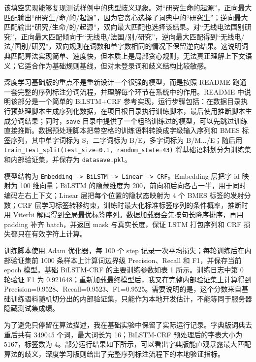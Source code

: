 \documentclass[12pt,a4paper,UTF8]{ctexart}
\newcommand{\xiaosi}{\fontsize{12pt}{18pt}\selectfont}
\newenvironment{reportbody}{\songti\xiaosi\onehalfspacing\sloppy}{}
\begin{document}
\begin{reportbody}
该填空实现能够复现测试样例中的典型歧义现象。对“研究生命的起源”，正向最大匹配输出“研究生/命/的/起源”，因为它贪心选择了词典中的“研究生”；逆向最大匹配输出“研究/生命/的/起源”，双向最大匹配也选择该结果。对“无线电法国别研究”，正向最大匹配倾向于“无线电/法国/别/研究”，逆向最大匹配得到“无线电/法/国别/研究”，双向规则在词数和单字数相同的情况下保留逆向结果。这说明词典匹配算法实现简单、速度快，但本质上是局部贪心规则，无法真正理解上下文语义；它适合作为基础规则基线，但对未登录词和歧义结构比较敏感。

深度学习基础版的重点不是重新设计一个很强的模型，而是按照 README 跑通一套完整的序列标注分词流程，并理解每个环节在系统中的作用。README 中说明该部分是一个简单的 BiLSTM+CRF 参考实现，运行步骤包括：在数据目录执行预处理脚本生成序列化数据，在项目根目录执行训练脚本，最后使用推断脚本生成分词结果；同时，\texttt{save} 目录中提供了一个粗略训练过的模型，可以先跳过训练直接推断。数据预处理脚本把带空格的训练语料转换成字级输入序列和 BMES 标签序列，其中单字词标为 S，二字词标为 B/E，多字词标为 B/M.../E；随后用 \texttt{train\_test\_split(test\_size=0.1, random\_state=43)} 将基础语料划分为训练集和内部验证集，并保存为 \texttt{datasave.pkl}。

模型结构为 \texttt{Embedding -> BiLSTM -> Linear -> CRF}。Embedding 层把字 id 映射为 100 维向量；BiLSTM 的隐藏维度为 200，前向和后向各占一半，用于同时编码左右上下文；Linear 层把每个位置的隐状态映射为 4 个 BMES 标签的发射分数；CRF 层学习标签转移约束，训练时最大化标准标签序列的条件概率，推断时用 Viterbi 解码得到全局最优标签序列。数据加载器会先按句长降序排序，再用 padding 补齐 batch，并返回 mask 与真实长度，保证 LSTM 打包序列和 CRF 损失都只在有效字符上计算。

训练脚本使用 Adam 优化器，每 100 个 step 记录一次平均损失；每轮训练后在内部验证集前 1000 条样本上计算词边界级 Precision、Recall 和 F1，并保存当前 epoch 模型。基础 BiLSTM-CRF 的主要训练参数如表 1 所示。训练日志中第 0 轮验证 F1 为 0.921648；重新加载最终模型后，我又在完整内部验证集上计算得到 Precision=0.9528、Recall=0.9523、F1=0.9525。需要说明的是，这个分数来自基础训练语料随机切分出的内部验证集，只能作为本地开发估计，不能等同于服务器隐藏测试集成绩。

为了避免只停留在算法描述，我在基础实验中保留了实际运行记录。字典版词典去重后共有 349045 个词，最大词长为 16；BiLSTM-CRF 预处理后的字表大小为 5167，标签数为 4。部分运行结果如下所示，可以看出字典版能直观暴露最大匹配算法的歧义，深度学习版则给出了完整序列标注流程下的本地验证指标。


\end{reportbody}
\end{document}

